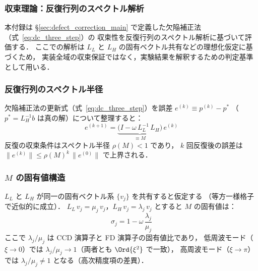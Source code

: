 %

\subsubsection{収束理論：反復行列のスペクトル解析}
\label{app:dc_convergence_theory}

本付録は §\ref{sec:defect_correction_main} で定義した欠陥補正法（式~\eqref{eq:dc_three_step}）の
収束性を反復行列のスペクトル解析に基づいて評価する．
ここでの解析は $L_L$ と $L_H$ の固有ベクトル共有などの理想化仮定に基づくため，
実装全域の収束保証ではなく，実験結果を解釈するための判定基準として用いる．

\subsubsection*{反復行列のスペクトル半径}

欠陥補正法の更新式（式~\eqref{eq:dc_three_step}）を誤差 $e^{(k)} \equiv p^{(k)} - p^*$
（$p^* = L_H^{-1} b$ は真の解）について整理すると：
\begin{equation}
  e^{(k+1)} = \underbrace{\bigl(I - \omega\,L_L^{-1}\,L_H\bigr)}_{\displaystyle \equiv M}\,e^{(k)}
  \label{eq:dc_iteration_matrix}
\end{equation}
反復の収束条件はスペクトル半径 $\rho(M) < 1$ であり，
$k$ 回反復後の誤差は $\|e^{(k)}\| \leq \rho(M)^k\,\|e^{(0)}\|$ で上界される．

\subsubsection*{\texorpdfstring{$M$ の固有値構造}{M の固有値構造}}

$L_L$ と $L_H$ が同一の固有ベクトル系 $\{v_j\}$ を共有すると仮定する
（等方一様格子で近似的に成立）．
$L_L\,v_j = \mu_j\,v_j$，$L_H\,v_j = \lambda_j\,v_j$ とすると
$M$ の固有値は：
\begin{equation}
  \sigma_j = 1 - \omega\,\frac{\lambda_j}{\mu_j}
  \label{eq:dc_eigenvalue}
\end{equation}
ここで $\lambda_j / \mu_j$ は CCD 演算子と FD 演算子の固有値比であり，
低周波モード（$\xi \to 0$）では $\lambda_j / \mu_j \to 1$（両者とも $\Ord{\xi^2}$ で一致），
高周波モード（$\xi \to \pi$）では $\lambda_j / \mu_j \neq 1$ となる（高次精度項の差異）．

